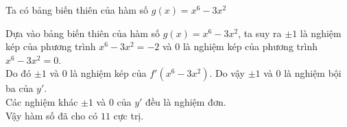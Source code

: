 \begin{ex}
{		Ta có bảng biến thiên của hàm số $g(x)=x^6-3x^2$ \\
		\begin{center}
		\end{center}
		\noindent		Dựa vào bảng biến thiên của hàm số $g(x)=x^6-3x^2$, ta suy ra $\pm 1$ là nghiệm kép của phương trình $x^6-3x^2=-2$ và $0$ là nghiệm kép của phương trình $x^6-3x^2=0$.\\
		Do đó $\pm 1$ và $0$ là nghiệm kép của $f'\left(x^6-3x^2\right)$. Do vậy $\pm 1$ và $0$ là nghiệm bội ba của $y'$.\\
		Các nghiệm khác $\pm 1$ và $0$ của $y'$ đều là nghiệm đơn.\\
		Vậy hàm số đã cho có $11$ cực trị.
	}
\end{ex}

